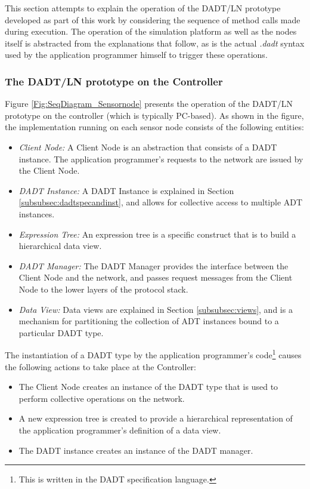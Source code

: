 This section attempts to explain the operation of the DADT/LN prototype
developed as part of this work by considering the sequence of method calls made
during execution. The operation of the simulation platform as well as the
nodes itself is abstracted from the explanations that follow, as is the actual
\emph{.dadt} syntax used by the application programmer himself to trigger these
operations. 

\subsubsection{The DADT/LN prototype on the Controller}

Figure \ref{Fig:SeqDiagram_Sensornode} presents the operation of the DADT/LN
prototype on the controller (which is typically PC-based). As shown in the figure, the implementation running on each sensor node 
consists of the following entities:

\begin{itemize}
  \item \emph{Client Node:} A Client Node is an abstraction that consists of a
  DADT instance. The application programmer's requests to the network are issued
  by the Client Node.
  \item \emph{DADT Instance:} A DADT Instance is explained in Section
  \ref{subsubsec:dadtspecandinst}, and allows for collective access to multiple
  ADT instances.
  \item \emph{Expression Tree:} An expression tree is a specific construct that is to
  build a hierarchical data view.
  \item \emph{DADT Manager:} The DADT Manager provides the interface between the
  Client Node and the network, and passes request messages from the Client Node
  to the lower layers of the protocol stack.
  \item \emph{Data View:} Data views are explained in Section
  \ref{subsubsec:views}, and is a mechanism for partitioning the collection of
  ADT instances bound to a particular DADT type.
\end{itemize}

The instantiation of a DADT type by the application programmer's
code\footnote{This is written in the DADT specification language.} causes the
following actions to take place at the Controller:
\begin{itemize}
  \item The Client Node creates an instance of the DADT type that is used to perform
collective operations on the network.  
\item A new expression tree is created to provide a hierarchical representation
of the application programmer's definition of a data view.
\item The DADT instance creates an instance of the DADT manager.
\end{itemize}

